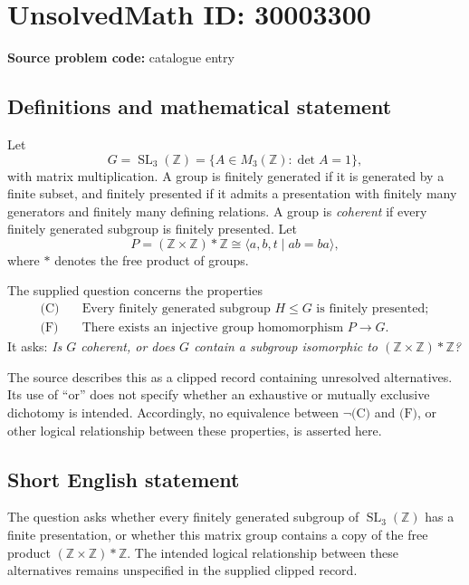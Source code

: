 \documentclass[11pt]{article}
\newcommand{\Z}{\mathbb{Z}}
\begin{document}
\section*{UnsolvedMath ID: 30003300}
\textbf{Source problem code:} catalogue entry
\subsection{Definitions and mathematical statement}
Let
\[
G=\operatorname{SL}_3(\Z)=\{A\in M_3(\Z):\det A=1\},
\]
with matrix multiplication. A group is finitely generated if it is generated by a finite subset, and finitely presented if it admits a presentation with finitely many generators and finitely many defining relations. A group is \emph{coherent} if every finitely generated subgroup is finitely presented. Let
\[
P=(\Z\times\Z)*\Z\cong\langle a,b,t\mid ab=ba\rangle,
\]
where \(*\) denotes the free product of groups.

The supplied question concerns the properties
\[
\begin{aligned}
\text{(C)}\quad &\text{Every finitely generated subgroup }H\leq G\text{ is finitely presented};\\
\text{(F)}\quad &\text{There exists an injective group homomorphism }P\longrightarrow G.
\end{aligned}
\]
It asks: \emph{Is \(G\) coherent, or does \(G\) contain a subgroup isomorphic to \((\Z\times\Z)*\Z\)?}

The source describes this as a clipped record containing unresolved alternatives. Its use of ``or'' does not specify whether an exhaustive or mutually exclusive dichotomy is intended. Accordingly, no equivalence between \(\neg\text{(C)}\) and \(\text{(F)}\), or other logical relationship between these properties, is asserted here.
\subsection{Short English statement}
The question asks whether every finitely generated subgroup of \(\operatorname{SL}_3(\Z)\) has a finite presentation, or whether this matrix group contains a copy of the free product \((\Z\times\Z)*\Z\). The intended logical relationship between these alternatives remains unspecified in the supplied clipped record.
\end{document}
